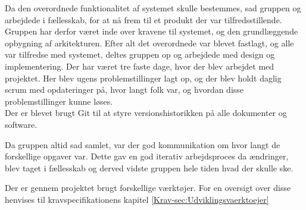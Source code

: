 Da den overordnede funktionalitet af systemet skulle bestemmes, sad gruppen og arbejdede i fællesskab, for at nå frem til et produkt der var tilfredsstillende. Gruppen har derfor været inde over kravene til systemet, og den grundlæggende opbygning af arkitekturen.
Efter alt det overordnede var blevet fastlagt, og alle var tilfredse med systemet, deltes gruppen op og arbejdede med design og implementering.
Der har været tre faste dage, hvor der blev arbejdet med projektet. Her blev ugens problemstillinger lagt op, og der blev holdt daglig scrum med opdateringer på, hvor langt folk var, og hvordan disse problemstillinger kunne løses. \\
Der er blevet brugt Git til at styre versionshistorikken på alle dokumenter og software. 

Da gruppen altid sad samlet, var der god kommunikation om hvor langt de forskellige opgaver var.
Dette gav en god iterativ arbejdsproces da ændringer, blev taget i fællesskab og derved vidste gruppen hele tiden hvad der skulle ske.

Der er gennem projektet brugt forskellige værktøjer. For en oversigt over disse henvises til kravspecifikationens kapitel \ref{Krav-sec:Udviklingsvaerktoejer}
